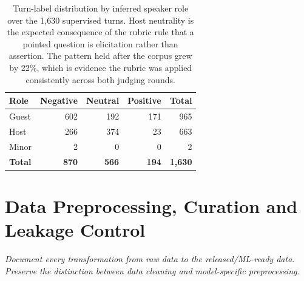 \documentclass[11pt,a4paper]{article}
\newcommand{\thd}[1]{\textbf{\sffamily\small #1}}          %
\begin{document}
\begin{table}[htbp]\centering
\caption{Turn-label distribution by inferred speaker role over the 1{,}630 supervised turns.
Host neutrality is the expected consequence of the rubric rule that a pointed question is
elicitation rather than assertion. The pattern held after the corpus grew by 22\%, which is
evidence the rubric was applied consistently across both judging rounds.}\label{tab:roledist}
\begin{tabular}{|l|r|r|r|r|}
\hline
\thd{Role} & \thd{Negative} & \thd{Neutral} & \thd{Positive} & \thd{Total} \\ \hline
Guest      & 602 & 192 & 171 & 965 \\ \hline
Host       & 266 & 374 & 23  & 663 \\ \hline
Minor      & 2   & 0   & 0   & 2 \\ \hline
\textbf{Total} & \textbf{870} & \textbf{566} & \textbf{194} & \textbf{1{,}630} \\ \hline
\end{tabular}
\end{table}

\section{Data Preprocessing, Curation and Leakage Control}

\emph{\small Document every transformation from raw data to the released/ML-ready data. Preserve
the distinction between data cleaning and model-specific preprocessing.}
\end{document}
